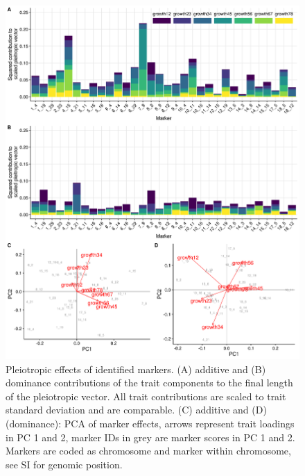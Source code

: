 \begin{refsection}
\begin{figure}
\includegraphics[width=\linewidth]{chapter_JoH-Melo_etal/media/growth_pleiotropic_partition_ad_dm.png}
\caption[Pleiotropic effects of identified markers]{Pleiotropic effects of identified markers. (A) additive
and (B) dominance contributions of the trait components to the final
length of the pleiotropic vector. All trait contributions are scaled to
trait standard deviation and are comparable. (C) additive and (D)
(dominance): PCA of marker effects, arrows represent trait loadings in
PC 1 and 2, marker IDs in grey are marker scores in PC 1 and 2. Markers
are coded as chromosome and marker within chromosome, see SI for genomic
position.}
\end{figure}


\end{refsection}
